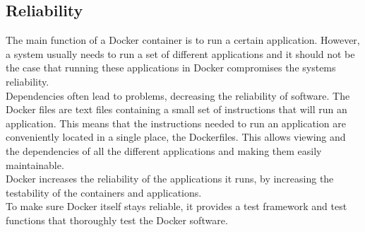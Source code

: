 \subsection{Reliability}
The main function of a Docker container is to run a certain application. However, a system usually needs to run a set of different applications and it should not be the case that running these applications in Docker compromises the systems reliability.\\
Dependencies often lead to problems\cite{dockerrepo}, decreasing the reliability of software. The Docker files are text files containing a small set of instructions that will run an application. This means that the instructions needed to run an application are conveniently located in a single place, the Dockerfiles. This  allows viewing and the dependencies of all the different applications and making them easily maintainable.\\
Docker increases the reliability of the applications it runs, by increasing the testability of the containers and applications.\\
To make sure Docker itself stays reliable, it provides a test framework and test functions that thoroughly test the Docker software.\\
%


